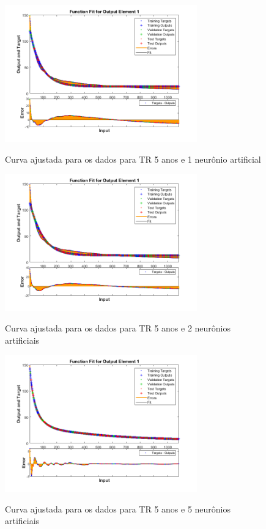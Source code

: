 \begin{figure}[H]
    \caption{Curva ajustada para os dados para TR 5 anos e 1 neurônio artificial}
    \centering
    \includegraphics[width=0.74\textwidth]{Textuais/Figuras/NN/tr5-1neuronio.png}
    \label{fig:tr5-1n}
\end{figure}

\begin{figure}[H]
    \caption{Curva ajustada para os dados para TR 5 anos e 2 neurônios artificiais}
    \centering
    \includegraphics[width=0.74\textwidth]{Textuais/Figuras/NN/tr5-2neuronio.png}
    \label{fig:tr5-2n}
\end{figure}

\begin{figure}[H]
    \caption{Curva ajustada para os dados para TR 5 anos e 5 neurônios artificiais}
    \centering
    \includegraphics[width=0.74\textwidth]{Textuais/Figuras/NN/tr5-5neuronio.png}
    \label{fig:tr5-5n}
\end{figure}

